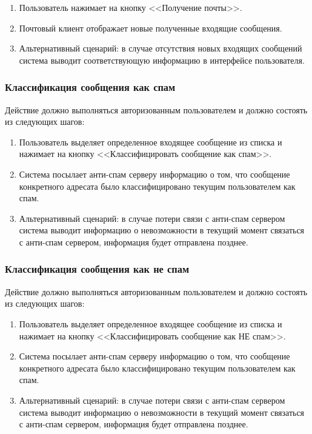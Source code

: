 \begin{enumerate}
  \item Пользователь нажимает на кнопку <<Получение почты>>.
  \item Почтовый клиент отображает новые полученные входящие сообщения.
  \item Альтернативный сценарий: в случае отсутствия новых входящих сообщений система выводит соответствующую информацию в интерфейсе пользователя.
\end{enumerate}

\subsubsection*{Классификация сообщения как спам}
Действие должно выполняться авторизованным пользователем и должно состоять из следующих шагов:

\begin{enumerate}
  \item Пользователь выделяет определенное входящее сообщение из списка и нажимает на кнопку <<Классифицировать сообщение как спам>>.
  \item Система посылает анти-спам серверу информацию о том, что сообщение конкретного адресата было классифицировано текущим пользователем как спам.
  \item Альтернативный сценарий: в случае потери связи с анти-спам сервером система выводит информацию о невозможности в текущий момент связаться с анти-спам сервером, информация будет отправлена позднее.
\end{enumerate}

\subsubsection*{Классификация сообщения как не спам}
Действие должно выполняться авторизованным пользователем и должно состоять из следующих шагов:

\begin{enumerate}
  \item Пользователь выделяет определенное входящее сообщение из списка и нажимает на кнопку <<Классифицировать сообщение как НЕ спам>>.
  \item Система посылает анти-спам серверу информацию о том, что сообщение конкретного адресата было классифицировано текущим пользователем как спам.
  \item Альтернативный сценарий: в случае потери связи с анти-спам сервером система выводит информацию о невозможности в текущий момент связаться с анти-спам сервером, информация будет отправлена позднее.
\end{enumerate}


